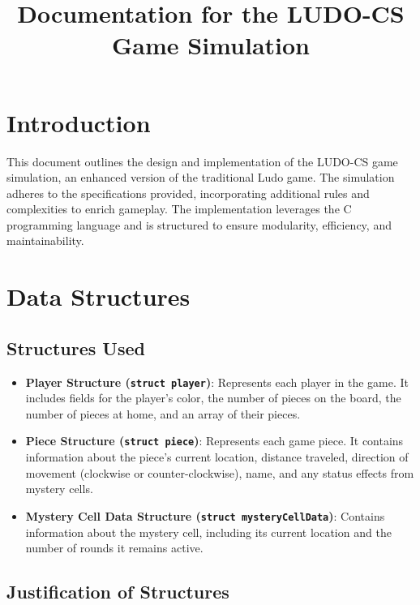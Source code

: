 \documentclass{article}
\title{Documentation for the LUDO-CS Game Simulation}
\author{}
\date{}
\begin{document}
\maketitle

\section{Introduction}
This document outlines the design and implementation of the LUDO-CS game simulation, an enhanced version of the traditional Ludo game. The simulation adheres to the specifications provided, incorporating additional rules and complexities to enrich gameplay. The implementation leverages the C programming language and is structured to ensure modularity, efficiency, and maintainability.

\section{Data Structures}

\subsection{Structures Used}

\begin{itemize}
    \item \textbf{Player Structure (\texttt{struct player})}: Represents each player in the game. It includes fields for the player's color, the number of pieces on the board, the number of pieces at home, and an array of their pieces.
    
    \item \textbf{Piece Structure (\texttt{struct piece})}: Represents each game piece. It contains information about the piece’s current location, distance traveled, direction of movement (clockwise or counter-clockwise), name, and any status effects from mystery cells.
    
    \item \textbf{Mystery Cell Data Structure (\texttt{struct mysteryCellData})}: Contains information about the mystery cell, including its current location and the number of rounds it remains active.
    \end{itemize}
    
    \subsection{Justification of Structures}
    
\end{document}
